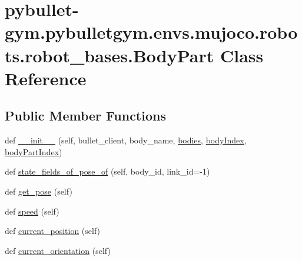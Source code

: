 \hypertarget{classpybullet-gym_1_1pybulletgym_1_1envs_1_1mujoco_1_1robots_1_1robot__bases_1_1_body_part}{}\section{pybullet-\/gym.pybulletgym.\+envs.\+mujoco.\+robots.\+robot\+\_\+bases.\+Body\+Part Class Reference}
\label{classpybullet-gym_1_1pybulletgym_1_1envs_1_1mujoco_1_1robots_1_1robot__bases_1_1_body_part}
\subsection*{Public Member Functions}
\begin{DoxyCompactItemize}
\item 
def \hyperlink{classpybullet-gym_1_1pybulletgym_1_1envs_1_1mujoco_1_1robots_1_1robot__bases_1_1_body_part_a0a2e5bb8b07e8240e213357d943d9232}{\+\_\+\+\_\+init\+\_\+\+\_\+} (self, bullet\+\_\+client, body\+\_\+name, \hyperlink{classpybullet-gym_1_1pybulletgym_1_1envs_1_1mujoco_1_1robots_1_1robot__bases_1_1_body_part_ae0e99371ef2718c7edeaf1ca04051256}{bodies}, \hyperlink{classpybullet-gym_1_1pybulletgym_1_1envs_1_1mujoco_1_1robots_1_1robot__bases_1_1_body_part_a29ba7cdcd3ed8af5bc4ca1b7ffdcb067}{body\+Index}, \hyperlink{classpybullet-gym_1_1pybulletgym_1_1envs_1_1mujoco_1_1robots_1_1robot__bases_1_1_body_part_af44bf7df9e7201c08a5235a3ebacff2c}{body\+Part\+Index})
\item 
def \hyperlink{classpybullet-gym_1_1pybulletgym_1_1envs_1_1mujoco_1_1robots_1_1robot__bases_1_1_body_part_a0e2c046dd00859b28c8c765213f25a3c}{state\+\_\+fields\+\_\+of\+\_\+pose\+\_\+of} (self, body\+\_\+id, link\+\_\+id=-\/1)
\item 
def \hyperlink{classpybullet-gym_1_1pybulletgym_1_1envs_1_1mujoco_1_1robots_1_1robot__bases_1_1_body_part_a1224c45cf1ec43f3af334c029b51da93}{get\+\_\+pose} (self)
\item 
def \hyperlink{classpybullet-gym_1_1pybulletgym_1_1envs_1_1mujoco_1_1robots_1_1robot__bases_1_1_body_part_accbcc39158a815b7d4bfa03d1b7cadd3}{speed} (self)
\item 
def \hyperlink{classpybullet-gym_1_1pybulletgym_1_1envs_1_1mujoco_1_1robots_1_1robot__bases_1_1_body_part_a7a8fa5909c7cf753feda931a2fe3d1c4}{current\+\_\+position} (self)
\item 
def \hyperlink{classpybullet-gym_1_1pybulletgym_1_1envs_1_1mujoco_1_1robots_1_1robot__bases_1_1_body_part_af8ff089022080431a417137d36ed6a2b}{current\+\_\+orientation} (self)

\end{DoxyCompactItemize}
